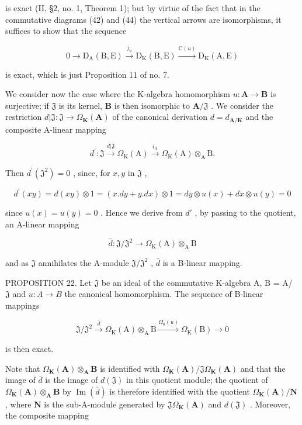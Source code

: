 is exact (II, §2, no. 1, Theorem 1); but by virtue of the fact that in the commutative diagrams (42) and (44) the vertical arrows are isomorphisms, it suffices to show that the sequence

\[
0 \longrightarrow \mathrm{D} _ {\mathrm{A}} (\mathrm{B}, \mathrm{E}) \xrightarrow {j _ {u}} \mathrm{D} _ {\mathrm{K}} (\mathrm{B}, \mathrm{E}) \xrightarrow {\mathrm{C} (u)} \mathrm{D} _ {\mathrm{K}} (\mathrm{A}, \mathrm{E})
\]

is exact, which is just Proposition 11 of no. 7.

We consider now the case where the K-algebra homomorphism \(u: \mathbf{A} \to \mathbf{B}\) is surjective; if \(\mathfrak{J}\) is its kernel, \(\mathbf{B}\) is then isomorphic to \(\mathbf{A} / \mathfrak{J}\) . We consider the restriction \(d| \mathfrak{J}: \mathfrak{J} \to \Omega_{\mathbf{K}}(\mathbf{A})\) of the canonical derivation \(d = d_{\mathbf{A} / \mathbf{K}}\) and the composite A-linear mapping

\[
d ^ {\prime}: \mathfrak {J} \xrightarrow {d | \mathfrak {J}} \Omega_ {\mathrm{K}} (\mathrm{A}) \xrightarrow {i _ {\mathrm{A}}} \Omega_ {\mathrm{K}} (\mathrm{A}) \otimes_ {\mathrm{A}} \mathrm{B}.
\]

Then \(d^{\prime}(\mathfrak{J}^{2}) = 0\) , since, for \(x, y\) in \(\mathfrak{J}\) ,

\[
d ^ {\prime} (x y) = d (x y) \otimes 1 = (x. d y + y. d x) \otimes 1 = d y \otimes u (x) + d x \otimes u (y) = 0
\]

since \(u(x) = u(y) = 0\) . Hence we derive from \(d'\) , by passing to the quotient, an A-linear mapping

\[
\bar {d} \colon \mathfrak {J} / \mathfrak {J} ^ {2} \rightarrow \Omega_ {\mathrm{K}} (\mathrm{A}) \otimes_ {\mathrm{A}} \mathrm{B}
\]

and as \(\mathfrak{J}\) annihilates the A-module \(\mathfrak{J} / \mathfrak{J}^2\) , \(\bar{d}\) is a B-linear mapping.

PROPOSITION 22. Let \(\mathfrak{J}\) be an ideal of the commutative K-algebra A, B = A/ \(\mathfrak{J}\) and \(u:A\to B\) the canonical homomorphism. The sequence of B-linear mappings

\[
\mathfrak {J} / \mathfrak {J} ^ {2} \xrightarrow {\overline {{d}}} \Omega_ {\mathrm{K}} (\mathrm{A}) \otimes_ {\mathrm{A}} \mathrm{B} \xrightarrow {\Omega_ {0} (u)} \Omega_ {\mathrm{K}} (\mathrm{B}) \to 0\tag{46}
\]

is then exact.

Note that \(\Omega_{\mathbf{K}}(\mathbf{A}) \otimes_{\mathbf{A}} \mathbf{B}\) is identified with \(\Omega_{\mathbf{K}}(\mathbf{A}) / \mathfrak{J} \Omega_{\mathbf{K}}(\mathbf{A})\) and that the image of \(\bar{d}\) is the image of \(d(\mathfrak{J})\) in this quotient module; the quotient of \(\Omega_{\mathbf{K}}(\mathbf{A}) \otimes_{\mathbf{A}} \mathbf{B}\) by \(\operatorname{Im}(\bar{d})\) is therefore identified with the quotient \(\Omega_{\mathbf{K}}(\mathbf{A}) / \mathbf{N}\) , where \(\mathbf{N}\) is the sub-A-module generated by \(\mathfrak{J} \Omega_{\mathbf{K}}(\mathbf{A})\) and \(d(\mathfrak{J})\) . Moreover, the composite mapping

